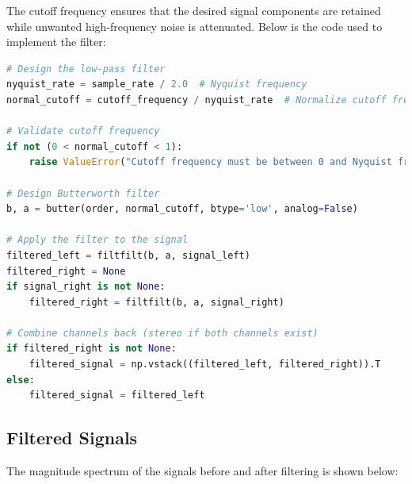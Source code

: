 \documentclass[12pt,a4paper]{article}
\begin{document}
The cutoff frequency ensures that the desired signal components are retained while unwanted high-frequency noise is attenuated. Below is the code used to implement the filter:
\begin{lstlisting}[language=Python, caption=Butterworth LPF Code]
# Design the low-pass filter
nyquist_rate = sample_rate / 2.0  # Nyquist frequency
normal_cutoff = cutoff_frequency / nyquist_rate  # Normalize cutoff frequency

# Validate cutoff frequency
if not (0 < normal_cutoff < 1):
    raise ValueError("Cutoff frequency must be between 0 and Nyquist frequency.")

# Design Butterworth filter
b, a = butter(order, normal_cutoff, btype='low', analog=False)

# Apply the filter to the signal
filtered_left = filtfilt(b, a, signal_left)
filtered_right = None
if signal_right is not None:
    filtered_right = filtfilt(b, a, signal_right)

# Combine channels back (stereo if both channels exist)
if filtered_right is not None:
    filtered_signal = np.vstack((filtered_left, filtered_right)).T
else:
    filtered_signal = filtered_left
\end{lstlisting}

\subsection{Filtered Signals}
The magnitude spectrum of the signals before and after filtering is shown below:
\end{document}
